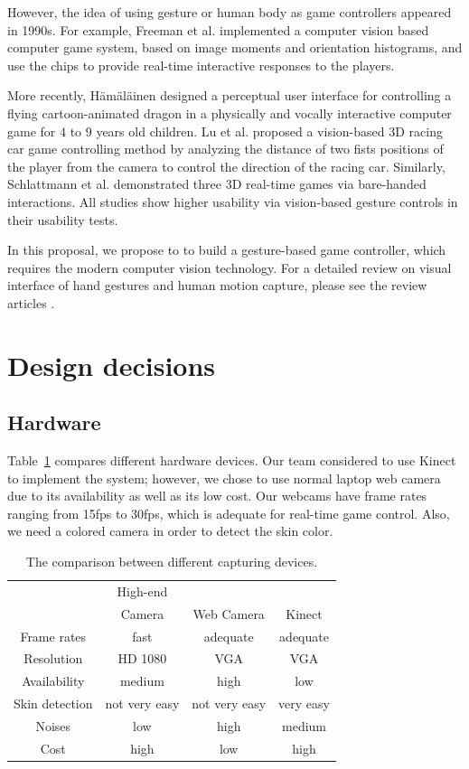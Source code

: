 \documentclass[10pt,twocolumn,letterpaper]{article}
\begin{document}
However, the idea of using gesture or human body as game
controllers appeared in 1990s. For example, 
Freeman et al. \cite{cvicg, cvfcg} implemented a computer vision based 
computer game system, based on image moments and orientation histograms, and 
use the chips to provide real-time interactive responses to the players. 

More recently, H\"{a}m\"{a}l\"{a}inen \cite{childgame} designed a perceptual user interface for
controlling a flying cartoon-animated dragon in a
physically and vocally interactive computer game for 4 to 9 years old children.
Lu et al. \cite{racecar} proposed a vision-based 3D racing car game controlling
method by analyzing the distance of two fists positions of the player
from the camera to control the direction of the racing car. Similarly, 
Schlattmann \cite{3dgames} et al. demonstrated three 3D real-time games via bare-handed 
interactions. All studies show higher usability via vision-based gesture controls 
in their usability tests.


In this proposal, we propose to to build a gesture-based game controller, which 
requires the modern computer vision technology. For a detailed review on visual 
interface of hand gestures and human motion capture, please see 
the review articles \cite{pamireview, cviureview}.

\section{Design decisions}
\subsection{Hardware}
Table~\ref{tab:hw} compares different hardware devices.
Our team considered to use Kinect to implement the system; however, 
we chose to use normal laptop web camera due to its availability as well as its 
low cost. 
Our webcams have frame rates ranging from 15fps to 30fps, which is adequate for real-time 
game control. Also, we need a colored camera in order to detect the skin color.

\begin{table}[h]
\begin{tabular}{c|ccc}
&High-end\\
&Camera&Web Camera&Kinect \\
\hline
Frame rates & fast & adequate & adequate \\
Resolution & HD 1080 & VGA & VGA \\
Availability & medium & high & low \\
Skin detection & not very easy & not very easy & very easy \\
Noises & low & high & medium \\
Cost & high & low & high 
\end{tabular}
\caption{The comparison between different capturing devices.}
\label{tab:hw}
\end{table}
\end{document}
